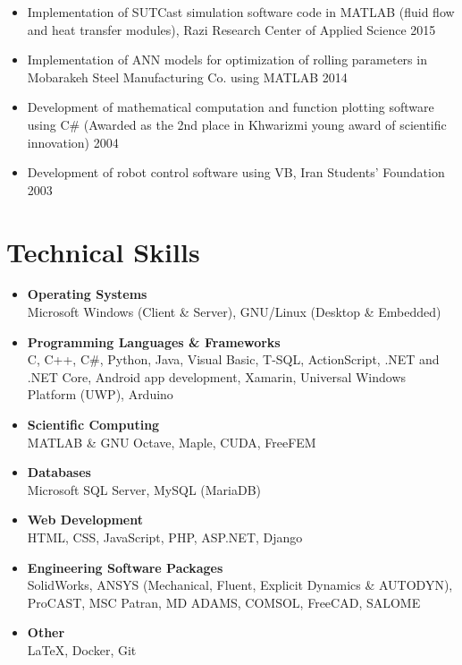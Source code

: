 \documentclass{cv}
\begin{document}
\begin{itemize}
\item
Implementation of SUTCast simulation software code in MATLAB (fluid flow and heat transfer modules), Razi Research Center of Applied Science \hfill 2015
\item
Implementation of ANN models for optimization of rolling parameters in Mobarakeh Steel Manufacturing Co. using MATLAB \hfill 2014
\item
Development of mathematical computation and function plotting software using C\# (Awarded as the 2nd place in Khwarizmi young award of scientific innovation) \hfill 2004
\item
Development of robot control software using VB, Iran Students' Foundation \hfill 2003

\end{itemize}



\section{Technical Skills}

\begin{itemize}

\item
 \textbf{Operating Systems} \\ Microsoft Windows (Client \& Server), GNU/Linux (Desktop \& Embedded)
 \item
\textbf{Programming Languages \& Frameworks}\\  C, C++, C\#, Python, Java, Visual Basic, T-SQL, ActionScript, .NET and .NET Core, Android app development, Xamarin, Universal Windows Platform (UWP), Arduino
\item
\textbf{Scientific Computing}\\  MATLAB \& GNU Octave, Maple, CUDA, FreeFEM
\item
\textbf{Databases}\\ Microsoft SQL Server, MySQL (MariaDB)
\item
\textbf{Web Development} \\
HTML, CSS, JavaScript, PHP, ASP.NET, Django
\item
\textbf{Engineering Software Packages}\\ SolidWorks, ANSYS (Mechanical, Fluent, Explicit Dynamics \& AUTODYN), ProCAST, MSC Patran, MD ADAMS, COMSOL, FreeCAD, SALOME
\item
\textbf{Other}\\  \LaTeX{}, Docker, Git

\end{itemize}
\end{document}
